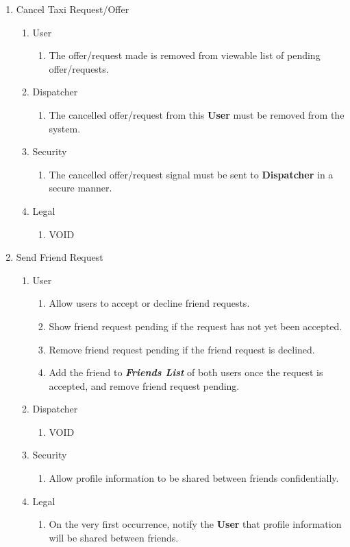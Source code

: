 \documentclass[english]{article}
\begin{document}
\begin{enumerate}[{BE}1.]
	\item Cancel Taxi Request/Offer
	\begin{enumerate}[{VP7}.1]
		\item User
			\begin{enumerate}
				\item The offer/request made is removed from viewable list of pending offer/requests.
			\end{enumerate}
		\item Dispatcher
			\begin{enumerate}
				\item The cancelled offer/request from this \textbf{User} must be removed from the system.
			\end{enumerate}
		\item Security
			\begin{enumerate}
				\item The cancelled offer/request signal must be sent to \textbf{Dispatcher} in a secure manner.
			\end{enumerate}
		\item Legal
			\begin{enumerate}
				\item VOID
			\end{enumerate}
	\end{enumerate}
	
	\item Send Friend Request
	\begin{enumerate}[{VP8}.1]
		\item User
			\begin{enumerate}
				\item Allow users to accept or decline friend requests.
				\item Show friend request pending if the request has not yet been accepted.
				\item Remove friend request pending if the friend request is declined.
				\item Add the friend to \textbf{\emph{Friends List}} of both users once the request is accepted, and remove friend request pending.
			\end{enumerate}
		\item Dispatcher
			\begin{enumerate}
				\item VOID
			\end{enumerate}
		\item Security
			\begin{enumerate}
				\item Allow profile information to be shared between friends confidentially.
			\end{enumerate}
		\item Legal
			\begin{enumerate}
				\item On the very first occurrence, notify the \textbf{User} that profile information will be shared between friends.
			\end{enumerate}
	\end{enumerate}
	

\end{enumerate}
\end{document}
